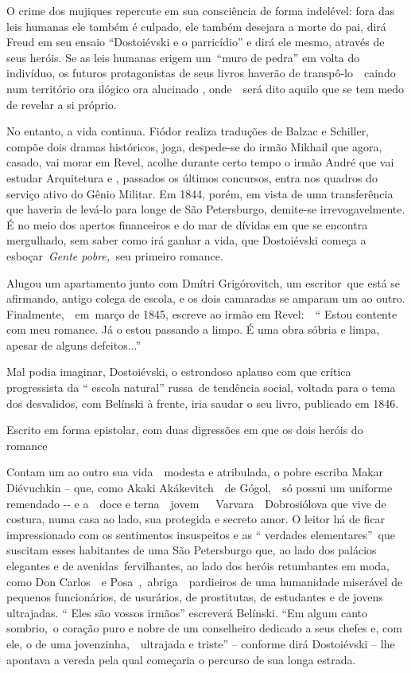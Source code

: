 O crime dos mujiques repercute em sua consciência de forma indelével:
fora das leis humanas ele também é culpado, ele também desejara a morte
do pai, dirá Freud em seu ensaio ``Dostoiévski e o parricídio'' e dirá
ele mesmo, através de seus heróis. Se as leis humanas erigem um~``muro
de pedra'' em volta do indivíduo, os futuros protagonistas de seus
livros haverão de transpô-lo~~caindo num território ora ilógico ora
alucinado , onde~~será dito aquilo que se tem medo de revelar a si
próprio.

No entanto, a vida continua. Fiódor realiza traduções de Balzac e
Schiller, compõe dois dramas históricos, joga, despede-se do irmão
Mikhail que agora, casado, vai morar em Revel, acolhe durante certo
tempo o irmão André que vai estudar Arquitetura e , passados os últimos
concursos, entra nos quadros do serviço ativo do Gênio Militar. Em 1844,
porém, em vista de uma transferência que haveria de levá-lo para longe
de São Petersburgo, demite-se irrevogavelmente. É no meio dos apertos
financeiros e do mar de dívidas em que se encontra mergulhado, sem saber
como irá ganhar a vida, que Dostoiévski começa a esboçar~\emph{Gente
pobre,~}seu primeiro romance.

Alugou um apartamento junto com Dmítri Grigórovitch, um escritor~que
está se afirmando, antigo colega de escola, e os dois camaradas se
amparam um ao outro. Finalmente,~~em~março de 1845, escreve ao irmão em
Revel:~~`` Estou contente com meu romance. Já o estou passando a limpo.
É uma obra sóbria e limpa, apesar de alguns defeitos...''

Mal podia imaginar, Dostoiévski, o estrondoso aplauso com que crítica
progressista da `` escola natural'' russa~de tendência social, voltada
para o tema dos desvalidos, com Belínski à frente, iria saudar o seu
livro, publicado em 1846.

Escrito em forma epistolar, com duas digressões em que os dois heróis do
romance

Contam um ao outro sua vida~~modesta e atribulada, o pobre escriba Makar
Diévuchkin -- que, como Akaki Akákevitch~~de Gógol,~~só possui um
uniforme remendado -\/- e a~~doce e terna~~jovem~~~Varvara~~Dobrosiólova
que vive de costura, numa casa ao lado, sua protegida e secreto amor. O
leitor há de ficar impressionado com os sentimentos insuspeitos e as ``
verdades elementares''~que suscitam esses habitantes de uma São
Petersburgo que, ao lado dos palácios elegantes e de
avenidas~fervilhantes, ao lado dos heróis retumbantes em moda, como Don
Carlos~~e Posa~\emph{,}~abriga~~pardieiros de uma humanidade miserável
de pequenos funcionários, de usurários, de prostitutas, de estudantes e
de jovens ultrajadas. `` Eles são vossos irmãos'' escreverá Belínski.
``Em algum canto sombrio,~o coração puro e nobre de um conselheiro
dedicado a seus chefes e, com ele, o de uma jovenzinha,~~ultrajada e
triste'' -- conforme dirá Dostoiévski -- lhe apontava a vereda pela qual
começaria o percurso de sua longa estrada.

